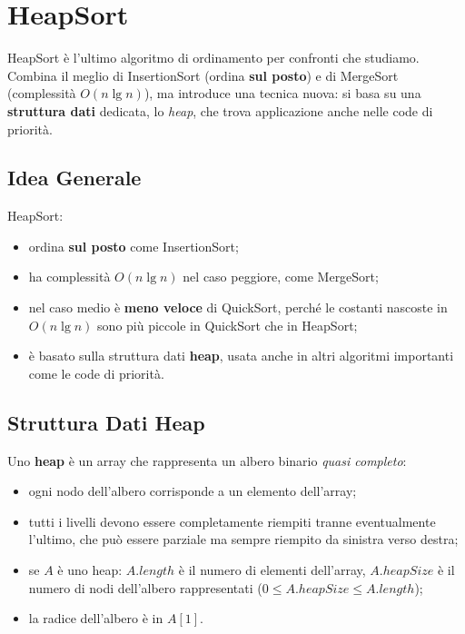 \section{HeapSort}

\begin{softnote}
	HeapSort è l'ultimo algoritmo di ordinamento per confronti che
	studiamo. Combina il meglio di InsertionSort (ordina \textbf{sul posto})
	e di MergeSort (complessità $O(n \lg n)$), ma introduce una tecnica
	nuova: si basa su una \textbf{struttura dati} dedicata, lo \emph{heap},
	che trova applicazione anche nelle code di priorità.
\end{softnote}

\subsection{Idea Generale}

HeapSort:
\begin{itemize}
	\item ordina \textbf{sul posto} come InsertionSort;
	\item ha complessità $O(n \lg n)$ nel caso peggiore, come MergeSort;
	\item nel caso medio è \textbf{meno veloce} di QuickSort, perché le
	costanti nascoste in $O(n \lg n)$ sono più piccole in QuickSort
	che in HeapSort;
	\item è basato sulla struttura dati \textbf{heap}, usata anche in
	altri algoritmi importanti come le code di priorità.
\end{itemize}

\subsection{Struttura Dati Heap}

\begin{definizione}
	Uno \textbf{heap} è un array che rappresenta un albero binario
	\emph{quasi completo}:
	\begin{itemize}
		\item ogni nodo dell'albero corrisponde a un elemento dell'array;
		\item tutti i livelli devono essere completamente riempiti tranne
		eventualmente l'ultimo, che può essere parziale ma sempre
		riempito da sinistra verso destra;
		\item se $A$ è uno heap: $A.\mathit{length}$ è il numero di elementi
		dell'array, $A.\mathit{heapSize}$ è il numero di nodi
		dell'albero rappresentati ($0 \le A.\mathit{heapSize} \le
		A.\mathit{length}$);
		\item la radice dell'albero è in $A[1]$.
	\end{itemize}
\end{definizione}

